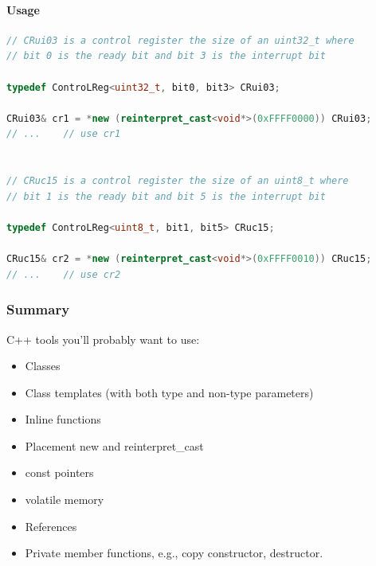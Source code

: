 \paragraph{Usage}
\begin{lstlisting}[language=C++]
// CRui03 is a control register the size of an uint32_t where
// bit 0 is the ready bit and bit 3 is the interrupt bit

typedef ControLReg<uint32_t, bit0, bit3> CRui03;

CRui03& cr1 = *new (reinterpret_cast<void*>(0xFFFF0000)) CRui03;
// ...    // use cr1


// CRuc15 is a control register the size of an uint8_t where
// bit 1 is the ready bit and bit 5 is the interrupt bit

typedef ControLReg<uint8_t, bit1, bit5> CRuc15;

CRuc15& cr2 = *new (reinterpret_cast<void*>(0xFFFF0010)) CRuc15;
// ...    // use cr2
\end{lstlisting}

\subsubsection{Summary}
C++ tools you'll probably want to use:
\begin{itemize}
  \item Classes
  \item Class templates (with both type and non-type parameters)
  \item Inline functions
  \item Placement new and reinterpret\_cast
  \item const pointers
  \item volatile memory
  \item References
  \item Private member functions, e.g., copy constructor, destructor.
\end{itemize}
